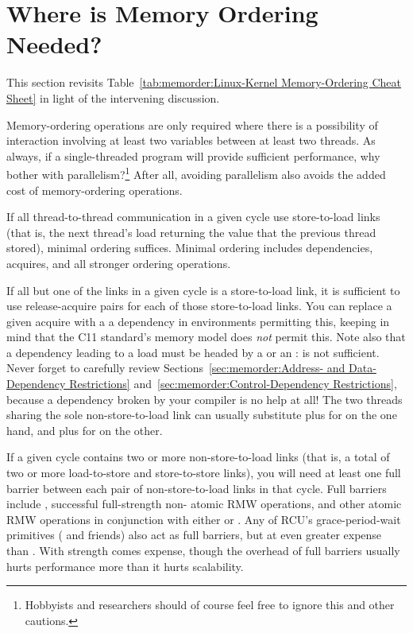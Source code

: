 \section{Where is Memory Ordering Needed?}
\label{sec:memorder:Where is Memory Ordering Needed?}

This section revisits
Table~\ref{tab:memorder:Linux-Kernel Memory-Ordering Cheat Sheet}
in light of the intervening discussion.

Memory-ordering operations are only required where there is a possibility
of interaction involving at least two variables between at least two
threads.
As always, if a single-threaded program will provide sufficient
performance, why bother with parallelism?\footnote{
	Hobbyists and researchers should of course feel free to ignore
	this and other cautions.}
After all, avoiding parallelism also avoids the added cost of
memory-ordering operations.

If all thread-to-thread communication in a given cycle use store-to-load links
(that is, the next thread's load returning the value that the previous thread
stored), minimal ordering suffices.
Minimal ordering includes dependencies, acquires, and all stronger
ordering operations.

If all but one of the links in a given cycle is a store-to-load
link, it is sufficient to use release-acquire pairs for each of
those store-to-load links.
You can replace a given acquire with a a dependency in environments permitting
this, keeping in mind that the C11 standard's memory model does \emph{not}
permit this.
Note also that a dependency leading to a load must be headed by
a  or an :
 is not sufficient.
Never forget to carefully review
Sections~\ref{sec:memorder:Address- and Data-Dependency Restrictions}
and~\ref{sec:memorder:Control-Dependency Restrictions}, because
a dependency broken by your compiler is no help at all!
The two threads sharing the sole non-store-to-load link can
usually substitute  plus  for
 on the one hand,
and  plus  for 
on the other.

If a given cycle contains two or more non-store-to-load links (that is,
a total of two or more load-to-store and store-to-store links), you will
need at least one full barrier between each pair of non-store-to-load
links in that cycle.
Full barriers include , successful full-strength non-
atomic RMW operations, and other atomic RMW operations in conjunction with
either  or .
Any of RCU's grace-period-wait primitives ( and
friends) also act as full barriers, but at even greater expense than
.
With strength comes expense, though the overhead of full barriers
usually hurts performance more than it hurts scalability.

